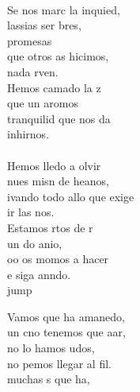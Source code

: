 \begin{cancion}%
	       \chord{(}{**)}{    }\\
	Se nos marc la inquied, \\
	lassias  ser bres,\\
	promesas\\
	que otros as hicimos,\\
	 nada rven.\\
	Hemos camado la z\\
	que un aromos\\
	  tranquilid que nos da\\
	 inhirnos.\\
	\jump\\
	Hemos lledo a olvir\\
	nues misn de heanos, \\
	ivando todo allo que exige\\
	ir las nos.\\
	Estamos rtos de r\\
	un do anio,\\
	oo os momos a hacer\\
	e siga anndo.\\jump\\
	\begin{chorus}%
	Vamos que  ha amanedo,\\
	un cno tenemos que aar,\\
	no lo hamos udos,\\
	no pemos llegar al fil.\\
	 muchas s que ha,\\

\end{chorus}
\end{cancion}
